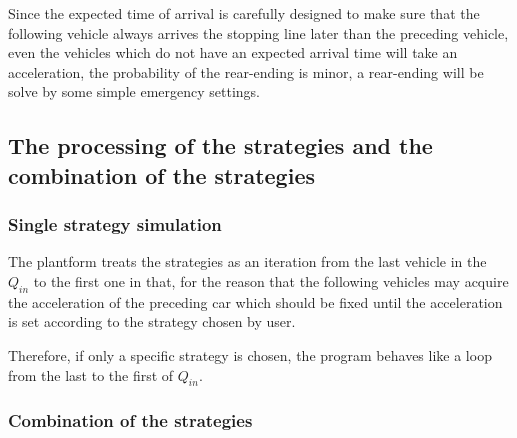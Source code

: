\documentclass[a4paper]{paper}
\begin{document}
Since the expected time of arrival is carefully designed to make sure that the following vehicle always arrives the stopping line later than the preceding vehicle, even the vehicles which do not have an expected arrival time will take an acceleration, the probability of the rear-ending is minor, a rear-ending will be solve by some simple emergency settings. 
\subsection{The processing of the strategies and the combination of the strategies}
\subsubsection{Single strategy simulation}
The plantform treats the strategies as an iteration from the last vehicle in the $Q_{in}$ to the first one in that, for the reason that the following vehicles may acquire the acceleration of the preceding car which should be fixed until the acceleration is set according to the strategy chosen by user. 

Therefore, if only a specific strategy is chosen, the program behaves like a loop from the last to the first of $Q_{in}$.

\subsubsection{Combination of the strategies}
\end{document}
